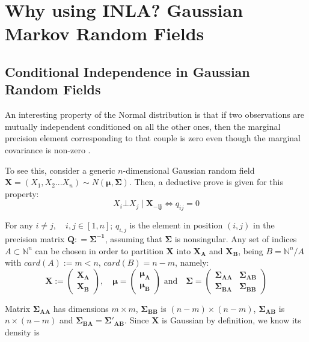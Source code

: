 \documentclass[openany]{book}
\begin{document}
\section[GMRFs]{Why using INLA? Gaussian Markov Random Fields}\label{section:GMRFs}

\subsection{Conditional Independence in Gaussian Random Fields}\label{par:GRFs}
An interesting property of the Normal distribution is that if two observations are mutually independent conditioned on all the other ones, then the marginal precision element corresponding to that couple is zero even though the marginal covariance is non-zero \cite{GMRFs}.

To see this, consider a generic $n$-dimensional Gaussian random field $\mathbf{X} = (X_1, X_2 .. . X_n) \sim N(\mathbf{\mu}, \mathbf{\Sigma})$. Then, a deductive prove is given for this property:
\begin{equation}
		X_i \bot X_j \mid \mathbf{X_{-ij}} \iff q_{ij} = 0
		\label{eq:theorem1}
\end{equation}

For any $i \neq j,  \quad i,j \in [1,n]$; $q_{i,j}$ is the element in position $(i,j)$ in the precision matrix $\mathbf{Q}: = \mathbf{\Sigma^{-1}}$, assuming that $\mathbf{\Sigma}$ is nonsingular. Any set of indices $A \subset \mathbb{N}^n$ can be chosen in order to partition $\mathbf{X}$ into $\mathbf{X_A}$ and $\mathbf{X_B}$, being $B = \mathbb{N}^n / A$ with $card(A) := m<n, \, card(B) = n-m$, namely:
	$$
	\mathbf{X} := \left( \begin{array}{l} \mathbf{X_A} \\ \mathbf{X_B}
		\end{array}
	\right)  , \quad 
		\mathbf{\mu} = \left( \begin{array}{l} \mathbf{\mu_A} \\ \mathbf{\mu_B}
	\end{array}
	\right)
	 \,\, \text{and} \quad 
	\mathbf{\Sigma} = \left( \begin{array}{ll} \mathbf{\Sigma_{AA}} & \mathbf{\Sigma_{AB}}
		 \\ \mathbf{\Sigma_{BA}} & \mathbf{\Sigma_{BB}}
	\end{array}
	\right)
	$$
    
Matrix $\mathbf{\Sigma_{AA}}$ has dimensions $m \times m$, $\mathbf{\Sigma_{BB}}$ is $(n-m) \times (n-m)$,	$\mathbf{\Sigma_{AB}}$ is $n \times (n-m)$ and $\mathbf{\Sigma_{BA}} = \mathbf{\Sigma'_{AB}}$. 
Since $\mathbf{X}$ is Gaussian by definition, we know its density is
\end{document}
